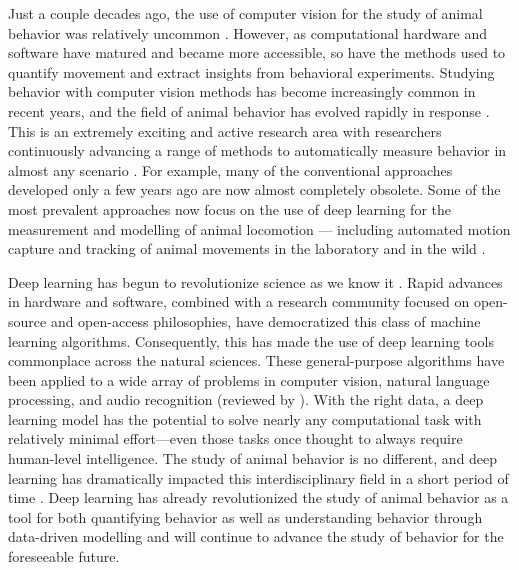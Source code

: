 \documentclass[11pt,a4paper,twoside]{book}
\begin{document}
\begin{doublespace}
Just a couple decades ago, the use of computer vision for the study of animal behavior was relatively uncommon \citep{dell2014automated}. However, as computational hardware and software have matured and became more accessible, so have the methods used to quantify movement and extract insights from behavioral experiments. Studying behavior with computer vision methods has become increasingly common in recent years, and the field of animal behavior has evolved rapidly in response \citep{anderson2014toward, berman2018measuring, brown2018ethology}. This is an extremely exciting and active research area with researchers continuously advancing a range of methods to automatically measure behavior in almost any scenario \citep{dell2014automated, anderson2014toward, graving2019deepposekit, mathis2020deep}. For example, many of the conventional approaches developed only a few years ago are now almost completely obsolete. Some of the most prevalent approaches now focus on the use of deep learning for the measurement and modelling of animal locomotion \citep{graving2019deepposekit, mathis2020deep, luxem2020identifying, graving2020vae} --- including automated motion capture and tracking of animal movements in the laboratory and in the wild \citep{nath2018, graving2019deepposekit, francisco2020high}. 

Deep learning has begun to revolutionize science as we know it \citep{lecun2015deep}. Rapid advances in hardware and software, combined with a research community focused on open-source and open-access philosophies, have democratized this class of machine learning algorithms. Consequently, this has made the use of deep learning tools commonplace across the natural sciences. These general-purpose algorithms have been applied to a wide array of problems in computer vision, natural language processing, and audio recognition (reviewed by \citealt{lecun2015deep}). With the right data, a deep learning model has the potential to solve nearly any computational task with relatively minimal effort---even those tasks once thought to always require human-level intelligence. The study of animal behavior is no different, and deep learning has dramatically impacted this interdisciplinary field in a short period of time \citep{graving2019deepposekit, mathis2020deep}. Deep learning has already revolutionized the study of animal behavior as a tool for both quantifying behavior \citep{mathis2018deeplabcut, pereira2019fast, romero2018idtracker, graving2019deepposekit} as well as understanding behavior through data-driven modelling \citep{johnson2016composing, luxem2020identifying, graving2020vaesne} and will continue to advance the study of behavior for the foreseeable future. 


\end{doublespace}
\end{document}
